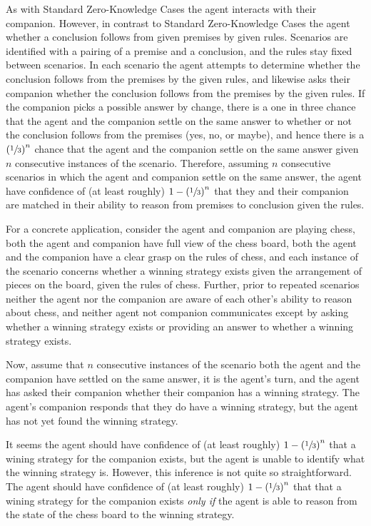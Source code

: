 \documentclass[10pt]{article}
\begin{document}
As with Standard Zero-Knowledge Cases the agent interacts with their companion.
However, in contrast to Standard Zero-Knowledge Cases the agent whether a conclusion follows from given premises by given rules.
Scenarios are identified with a pairing of a premise and a conclusion, and the rules stay fixed between scenarios.
In each scenario the agent attempts to determine whether the conclusion follows from the premises by the given rules, and likewise asks their companion whether the conclusion follows from the premises by the given rules.
If the companion picks a possible answer by change, there is a one in three chance that the agent and the companion settle on the same answer to whether or not the conclusion follows from the premises (yes, no, or maybe), and hence there is a \(\left(\sfrac{1}{3}\right)^{n}\) chance that the agent and the companion settle on the same answer given \(n\) consecutive instances of the scenario.
Therefore, assuming \(n\) consecutive scenarios in which the agent and companion settle on the same answer, the agent have confidence of (at least roughly) \(1 - \left(\sfrac{1}{3}\right)^{n}\) that they and their companion are matched in their ability to reason from premises to conclusion given the rules.

For a concrete application, consider the agent and companion are playing chess, both the agent and companion have full view of the chess board, both the agent and the companion have a clear grasp on the rules of chess, and each instance of the scenario concerns whether a winning strategy exists given the arrangement of pieces on the board, given the rules of chess.
Further, prior to repeated scenarios neither the agent nor the companion are aware of each other's ability to reason about chess, and neither agent not companion communicates except by asking whether a winning strategy exists or providing an answer to whether a winning strategy exists.

Now, assume that \(n\) consecutive instances of the scenario both the agent and the companion have settled on the same answer, it is the agent's turn, and the agent has asked their companion whether their companion has a winning strategy.
The agent's companion responds that they do have a winning strategy, but the agent has not yet found the winning strategy.

It seems the agent should have confidence of (at least roughly) \(1 - \left(\sfrac{1}{3}\right)^{n}\) that a wining strategy for the companion exists, but the agent is unable to identify what the winning strategy is.
However, this inference is not quite so straightforward.
The agent should have confidence of (at least roughly) \(1 - \left(\sfrac{1}{3}\right)^{n}\) that that a wining strategy for the companion exists \emph{only if} the agent is able to reason from the state of the chess board to the winning strategy.
\end{document}
